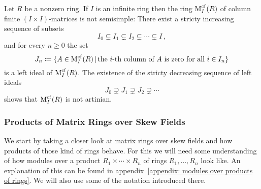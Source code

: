 \begin{example}
  \label{example: infinite matrix ring not semisimple}
  Let $R$ be a nonzero ring.
  If $I$ is an infinite ring then the ring $\operatorname{M}_I^{{\operatorname{cf}}}(R)$ of column finite $(I \times I)$-matrices is not semisimple:
  There exist a stricty increasing sequence of subsets
  \[
                I_0
    \subsetneq  I_1
    \subsetneq  I_2
    \subsetneq  \dotsb
    \subsetneq  I \,,
  \]
  and for every $n \geq 0$ the set
  \[
              J_n
    \defined  \{
                A \in \Mat_I^{\cf}(R)
              \suchthat
                \text{the $i$-th column of $A$ is zero for all $i \in I_n$}
              \}
  \]
  is a left ideal of $\operatorname{M}_I^{{\operatorname{cf}}}(R)$.
  The existence of the stricty decreasing sequence of left ideals
  \[
                J_0
    \supsetneq  J_1
    \supsetneq  J_2
    \supsetneq  \dotsb
  \]
  shows that $\operatorname{M}_I^{{\operatorname{cf}}}(R)$ is not artinian.
\end{example}





\subsubsection{Products of Matrix Rings over Skew Fields}


\begin{fluff}
  We start by taking a closer look at matrix rings over skew fields and how products of those kind of rings behave.
  For this we will need some understanding of how modules over a product  $R_1 \times \dotsb \times R_n$ of rings $R_1, \dotsc, R_n$ look like.
  An explanation of this can be found in appendix~\ref{appendix: modules over products of rings}.
  We will also use some of the notation introduced there.
\end{fluff}


